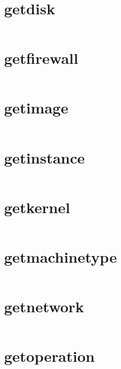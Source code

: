 \section{getdisk}
\begin{lstlisting}[language=Bash]
\end{lstlisting}

\section{getfirewall}
\begin{lstlisting}[language=Bash]
\end{lstlisting}

\section{getimage}
\begin{lstlisting}[language=Bash]
\end{lstlisting}

\section{getinstance}
\begin{lstlisting}[language=Bash]
\end{lstlisting}

\section{getkernel}
\begin{lstlisting}[language=Bash]
\end{lstlisting}

\section{getmachinetype}
\begin{lstlisting}[language=Bash]
\end{lstlisting}

\section{getnetwork}
\begin{lstlisting}[language=Bash]
\end{lstlisting}

\section{getoperation}
\begin{lstlisting}[language=Bash]
\end{lstlisting}


